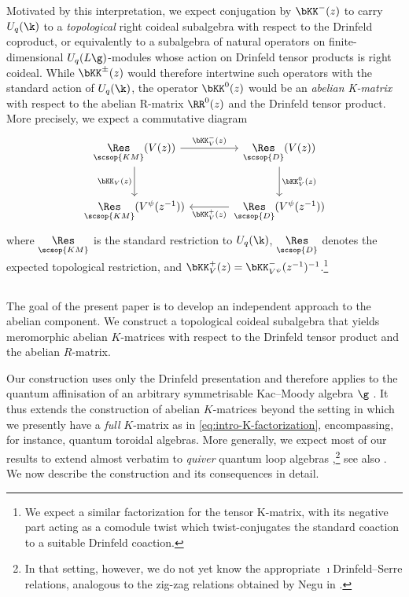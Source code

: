 \documentclass[reqno]{amsart}
\numberwithin{equation}{section}
\begin{document}
Motivated by this interpretation, we expect conjugation by $\bKK^-(z)$ to carry 
$U_q(\k)$ to a {\em topological} right coideal subalgebra with respect to the Drinfeld 
coproduct, or equivalently to a subalgebra of natural operators 
on finite-dimensional $U_q(L\g)$-modules whose action on Drinfeld tensor products is 
right coideal. While $\bKK^{\pm}(z)$ would therefore intertwine such operators with the 
standard action of $U_q(\k)$, the operator $\bKK^0(z)$ would be an \emph{abelian 
K-matrix} with respect to the abelian R-matrix $\RR^0(z)$ and the Drinfeld tensor 
product. More precisely,
we expect a commutative diagram
\[
	\begin{tikzcd}[column sep=large,row sep=large]
		\underset{\scsop{KM}}{\Res}(V(z)) 
		\arrow[r,"\bKK^-_V(z)"]
		\arrow[d,"\bKK_V(z)"']
		&\underset{\scsop{D}}{\Res}(V(z))
		\arrow[d,"\bKK^0_V(z)"]\\
		\underset{\scsop{KM}}{\Res}(V^\psi(z^{-1}))
		&\underset{\scsop{D}}{\Res}(V^{\psi}(z^{-1}))
		\arrow[l,"\bKK^+_V(z)"]
	\end{tikzcd}
\]
where $\underset{\scsop{KM}}{\Res}$ is the standard restriction to $U_q(\k)$, $\underset{\scsop{D}}{\Res}$ denotes the expected topological restriction, and $\bKK^+_V(z)=\bKK^-_{V^\psi}(z^{-1})^{-1}$.\footnote{We expect a similar factorization for the tensor K-matrix, with its negative part acting as a comodule twist which twist-conjugates the standard coaction to a suitable {Drinfeld} coaction.}

\subsection{}
The goal of the present paper is to develop an independent approach to the abelian component. We construct a topological coideal subalgebra that yields meromorphic abelian $K$-matrices with respect to the Drinfeld tensor product and the abelian $R$-matrix.

Our construction uses only the Drinfeld presentation and therefore applies to the quantum affinisation of an arbitrary symmetrisable Kac--Moody algebra $\g$ \cite{hernandez-05,hernandez-07}. It thus extends the construction of abelian $K$-matrices beyond the setting in which we presently have a \emph{full} $K$-matrix as in \eqref{eq:intro-K-factorization}, encompassing, for instance, quantum toroidal algebras. More generally, we expect most of our results to extend almost verbatim to \emph{quiver} quantum loop algebras \cite{negut-arbitrary-quivers, negut-sala-schiffmann-25,  appel-gautam-26},\footnote{In that setting, however, we do not yet know the appropriate $\imath$Drinfeld--Serre relations, analogous to the zig-zag relations obtained by Negu in \cite{negut-symmetric-cartan}.}
see also \cite{ding-iohara-97}.
We now describe the construction and its consequences in detail.
\end{document}
